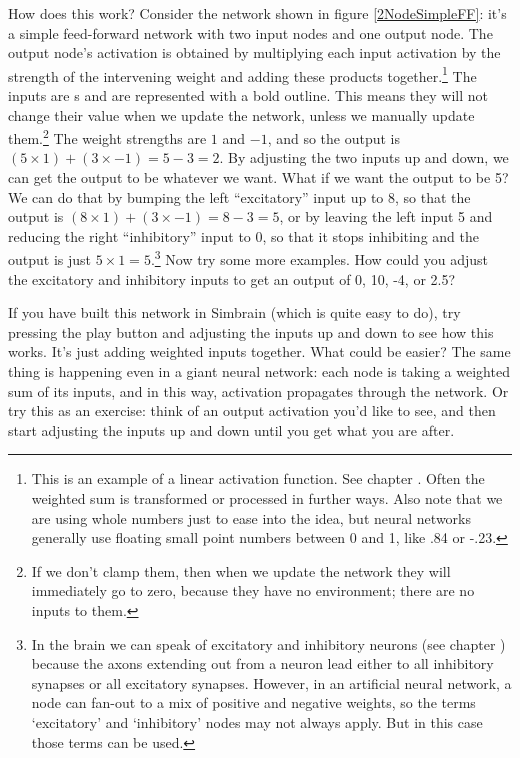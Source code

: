 How does this work? Consider the network shown in figure \ref{2NodeSimpleFF}: it's a simple feed-forward network with two input nodes and one output node. The output node's activation is obtained by multiplying each input activation by the strength of the intervening weight and adding these products together.\footnote{This is an example of a linear activation function. See chapter . Often the weighted sum is transformed or processed in further ways. Also note that we are using whole numbers just to ease into the idea, but neural networks generally use floating small point numbers between 0 and 1, like .84 or -.23.}  The inputs are s and are represented with a bold outline. This means they will not change their value when we update the network, unless we manually update them.\footnote{If we don't clamp them, then when we update the network they will immediately go to zero, because they have no environment; there are no inputs to them.} The weight strengths are $1$ and $-1$, and so the output is $(5 \times 1) + (3 \times -1) = 5 - 3 = 2$. By adjusting the two inputs up and down, we can get the output to be whatever we want. What if we want the output to be 5? We can do that by bumping the left  ``excitatory'' input up to 8, so that the output is $(8 \times 1) + (3 \times -1) = 8 - 3 = 5$, or by leaving the left input 5 and reducing the right ``inhibitory'' input to 0, so that it stops inhibiting and the output is just $5 \times 1 = 5$.\footnote{In the brain we can speak of excitatory and inhibitory neurons (see chapter ) because the axons extending out from a neuron lead either to all inhibitory synapses or all excitatory synapses. However, in an artificial neural network, a node can fan-out to a mix of positive and negative weights, so the terms `excitatory' and `inhibitory' nodes may not always apply. But in this case those terms can be used.} Now try some more examples. How could you adjust the excitatory and inhibitory inputs to get an output of 0, 10, -4, or 2.5?

If you have built this network in Simbrain (which is quite easy to do), try pressing the play button and adjusting the inputs up and down to see how this works. It's just adding weighted inputs together. What could be easier? The same thing is happening even in a giant neural network: each node is taking a weighted sum of its inputs, and in this way, activation propagates through the network. Or try this as an exercise: think of an output activation you'd like to see, and then start adjusting the inputs up and down until you get what you are after.

